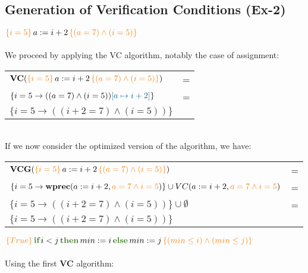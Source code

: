 \documentclass[11pt]{article}
\newcommand{\kw}[1]{{\color{OliveGreen}{#1}}}
\newcommand{\horange}[1]{{\color{BurntOrange}{#1}}}
\newcommand{\hblue}[1]{{\color{MidnightBlue}{#1}}}
\newcommand{\hoaret}[3]{{\color{BurntOrange}{\{#1\}}}\,#2\,{\color{BurntOrange}{\{#3\}}}}
\begin{document}
\subsection*{Generation of Verification Conditions (Ex-2)}

 $\hoaret{i = 5}{a := i + 2}{(a = 7) \land (i = 5)}$\\\vspace{0.3cm}\\
We proceed by applying the VC algorithm, notably the case of assignment:\\

\begin{tabular}{ll}
$\textbf{VC}(\hoaret{i = 5}{a := i + 2}{(a = 7) \land (i = 5)})$ & =\\
$\{i = 5 \to ((a = 7) \land (i = 5))\hblue{[a \mapsto i + 2]}\}$ & =\\
$\{i = 5 \to ((i+2=7) \land (i=5))\}$
\end{tabular}\\

\noindent If we now consider the optimized version of the algorithm, we have:\\

\begin{tabular}{ll}
$\textbf{VCG}(\hoaret{i = 5}{a := i + 2}{(a = 7) \land (i = 5)})$ & =\\
$\{i = 5 \to \textbf{wprec}(a := i + 2,\horange{a = 7 \land i = 5})\} \cup VC(a := i + 2,\horange{a = 7 \land i = 5})$ & =\\
$\{i = 5 \to ((i+2=7) \land (i=5))\} \cup \emptyset$ & =\\
$\{i = 5 \to ((i+2=7) \land (i=5))\}$
\end{tabular}\vspace{0.5cm}

 $\hoaret{True}{\textbf{\kw{if}}\,i<j\,\textbf{\kw{then}}\,min := i\,\textbf{\kw{else}}\,min := j}{(min \leq i) \land (min \leq j)}$\\\vspace{0.3cm}\\
Using the first \textbf{VC} algorithm:\\
\end{document}
